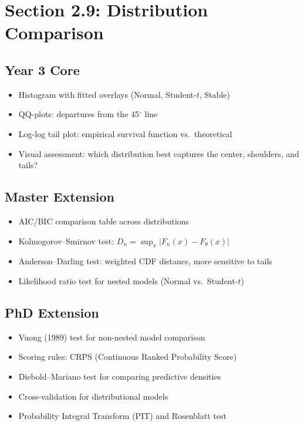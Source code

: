 \documentclass[11pt, a4paper]{article}
\theoremstyle{definition}
\begin{document}
\section{Section 2.9: Distribution Comparison}

\subsection{Year 3 Core}
\begin{itemize}
  \item Histogram with fitted overlays (Normal, Student-$t$, Stable)
  \item QQ-plots: departures from the 45$^\circ$ line
  \item Log-log tail plot: empirical survival function vs.\ theoretical
  \item Visual assessment: which distribution best captures the center, shoulders, and tails?
\end{itemize}

\subsection{Master Extension}
\begin{itemize}
  \item AIC/BIC comparison table across distributions
  \item Kolmogorov--Smirnov test: $D_n = \sup_x |F_n(x) - F_\theta(x)|$
  \item Anderson--Darling test: weighted CDF distance, more sensitive to tails
  \item Likelihood ratio test for nested models (Normal vs.\ Student-$t$)
\end{itemize}

\subsection{PhD Extension}
\begin{itemize}
  \item Vuong (1989) test for non-nested model comparison
  \item Scoring rules: CRPS (Continuous Ranked Probability Score)
  \item Diebold--Mariano test for comparing predictive densities
  \item Cross-validation for distributional models
  \item Probability Integral Transform (PIT) and Rosenblatt test
\end{itemize}
\end{document}
